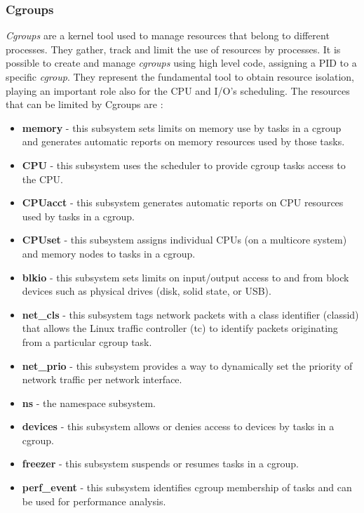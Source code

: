\documentclass[a4paper,12pt]{article}
\begin{document}
\subsubsection{Cgroups}

\textit{Cgroups} are a kernel tool used to manage resources that belong to
different processes. They gather, track and limit the use of resources by
processes. It is possible to create and manage \textit{cgroups} using high level
code, assigning a PID to a specific \textit{cgroup}. They represent the
fundamental tool to obtain resource isolation, playing an important role also
for the CPU and I/O's scheduling. The resources that can be limited by Cgroups
are \cite{red_hat_introduction_to_cgroups}:
\begin{itemize}
  \item \textbf{memory} - this subsystem sets limits on memory use by tasks in a
  cgroup and generates automatic reports on memory resources used by those
  tasks. 
  \item \textbf{CPU} - this subsystem uses the scheduler to provide cgroup tasks
  access to the CPU. 
  \item \textbf{CPUacct} - this subsystem generates automatic reports on CPU
  resources used by tasks in a cgroup. 
  \item \textbf{CPUset} - this subsystem assigns individual CPUs (on a multicore
  system) and memory nodes to tasks in a cgroup.
  \item \textbf{blkio} - this subsystem sets limits on input/output access to
  and from block devices such as physical drives (disk, solid state, or USB). 
  \item \textbf{net\_cls} - this subsystem tags network packets with a class
  identifier (classid) that allows the Linux traffic controller (tc) to identify
  packets originating from a particular cgroup task. 
  \item \textbf{net\_prio} - this subsystem provides a way to dynamically set
  the priority of network traffic per network interface. 
  \item \textbf{ns} - the namespace subsystem. 
  \item \textbf{devices} - this subsystem allows or denies access to devices by
  tasks in a cgroup. 
  \item \textbf{freezer} - this subsystem suspends or resumes tasks in a cgroup.
  \item \textbf{perf\_event} - this subsystem identifies cgroup membership of
  tasks and can be used for performance analysis. 
\end{itemize}   
\end{document}
